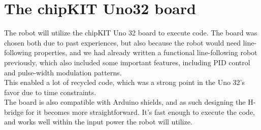 


\section{The chipKIT Uno32 board}
The robot will utilize the chipKIT Uno 32 board to execute code. The board
was chosen both due to past experiences, but also because the robot would need
line-following properties, and we had already written a functional line-following robot
previously, which also included some important features, including PID control and 
pulse-width modulation patterns. \\
This enabled a lot of recycled code, which was a strong point
in the Uno 32's favor due to time constraints. \\

The board is also compatible with Arduino shields, and as such designing the H-bridge for it
becomes more straightforward. It's fast enough to execute the code, and works well within the
input power the robot will utilize.

